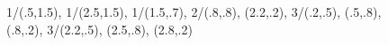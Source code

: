 \documentclass{article}
\begin{document}
  \begin{figure}
  \end{figure}

  \begin{figure}
    {%
      {1/{(.5,1.5)}},%
      {1/{(2.5,1.5)}},%
      {1/{(1.5,.7)}},%
      {2/{(.8,.8), (2.2,.2)}},%
      {3/{(.2,.5), (.5,.8), (.8,.2)}},%
      {3/{(2.2,.5), (2.5,.8), (2.8,.2)}}%
    }{}
  \end{figure}
\end{document}
